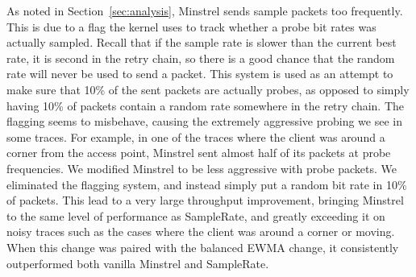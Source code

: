 \documentclass[twocolumn,10pt]{article}
\begin{document}
As noted in Section~\ref{sec:analysis}, Minstrel sends sample packets
too frequently. This is due to a flag the kernel uses to track whether
a probe bit rates was actually sampled. Recall that if the sample rate
is slower than the current best rate, it is second in the retry chain, 
so there is a good chance that the random rate will never be used to
send a packet. This system is used as an attempt to make sure that 10\%
of the sent packets are actually probes, as opposed to simply having 
10\% of packets contain a random rate somewhere in the retry chain.
 The flagging seems to misbehave, causing the extremely aggressive probing
we see in some traces.  For example, in one of the traces where the
client was around a corner from the access point, Minstrel sent almost
half of its packets at probe frequencies.  We modified Minstrel to be
less aggressive with probe packets. We eliminated the flagging system,
and instead simply put a random bit rate in 10\% of packets.
This lead to a very large throughput improvement, bringing Minstrel to
the same level of performance as SampleRate, and greatly exceeding it 
on noisy traces such as the cases where the client was around a corner or
moving. When this change was paired with the balanced EWMA change, it
consistently outperformed both vanilla Minstrel and SampleRate. 
\end{document}
